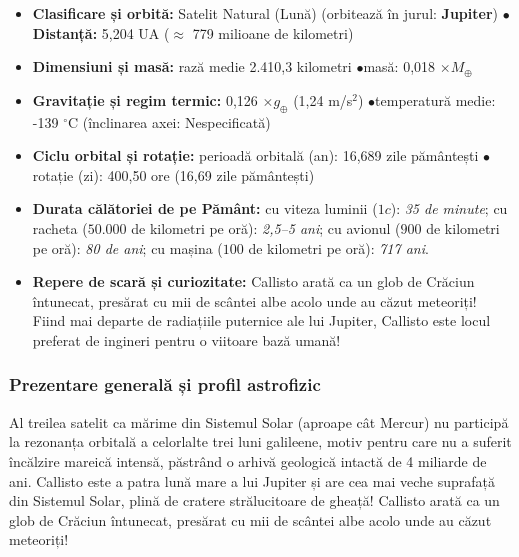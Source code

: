 \begin{tcolorbox}[orbitardata, title={\textbf{Repere esențiale: Callisto}}]
\small
\begin{itemize}[leftmargin=1.4em, itemsep=2pt, topsep=2pt]
  \item \textbf{Clasificare și orbită:} Satelit Natural (Lună) (orbitează în jurul: \textbf{Jupiter}) \quad$\bullet$\quad \textbf{Distanță:} 5,204 UA ($\approx$ 779 milioane de kilometri)
  \item \textbf{Dimensiuni și masă:} rază medie 2.410,3 kilometri \quad$\bullet$\quad masă: 0,018 $\times M_\oplus$
  \item \textbf{Gravitație și regim termic:} 0,126 $\times g_\oplus$ (1,24 m/s$^2$) \quad$\bullet$\quad temperatură medie: -139 $^\circ$C (înclinarea axei: Nespecificată)
  \item \textbf{Ciclu orbital și rotație:} perioadă orbitală (an): 16,689 zile pământești \quad$\bullet$\quad rotație (zi): 400,50 ore (16,69 zile pământești)
  \item \textbf{Durata călătoriei de pe Pământ:} cu viteza luminii ($1c$): \emph{35 de minute}; cu racheta ($50.000$ de kilometri pe oră): \emph{2,5--5 ani}; cu avionul ($900$ de kilometri pe oră): \emph{80 de ani}; cu mașina ($100$ de kilometri pe oră): \emph{717 ani}.
  \item \textbf{Repere de scară și curiozitate:} Callisto arată ca un glob de Crăciun întunecat, presărat cu mii de scântei albe acolo unde au căzut meteoriți! Fiind mai departe de radiațiile puternice ale lui Jupiter, Callisto este locul preferat de ingineri pentru o viitoare bază umană!
\end{itemize}
\end{tcolorbox}

\subsubsection*{Prezentare generală și profil astrofizic}
Al treilea satelit ca mărime din Sistemul Solar (aproape cât Mercur) nu participă la rezonanța orbitală a celorlalte trei luni galileene, motiv pentru care nu a suferit încălzire mareică intensă, păstrând o arhivă geologică intactă de 4 miliarde de ani. Callisto este a patra lună mare a lui Jupiter și are cea mai veche suprafață din Sistemul Solar, plină de cratere strălucitoare de gheață! Callisto arată ca un glob de Crăciun întunecat, presărat cu mii de scântei albe acolo unde au căzut meteoriți!

